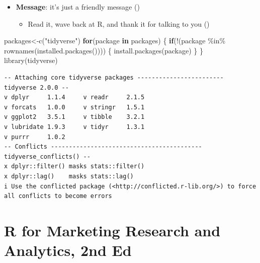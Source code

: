 \documentclass[
  ignorenonframetext,
]{beamer}
\newenvironment{Shaded}{\begin{snugshade}}{\end{snugshade}}
\newcommand{\ControlFlowTok}[1]{\textcolor[rgb]{0.00,0.23,0.31}{\textbf{#1}}}
\newcommand{\FunctionTok}[1]{\textcolor[rgb]{0.28,0.35,0.67}{#1}}
\newcommand{\NormalTok}[1]{\textcolor[rgb]{0.00,0.23,0.31}{#1}}
\newcommand{\OtherTok}[1]{\textcolor[rgb]{0.00,0.23,0.31}{#1}}
\newcommand{\SpecialCharTok}[1]{\textcolor[rgb]{0.37,0.37,0.37}{#1}}
\newcommand{\StringTok}[1]{\textcolor[rgb]{0.13,0.47,0.30}{#1}}
\providecommand{\tightlist}{%
  \setlength{\itemsep}{0pt}\setlength{\parskip}{0pt}}\usepackage{longtable,booktabs,array}
\begin{document}
\begin{frame}[fragile]{}
\label{section-12}
\normalsize

\begin{itemize}
\item
  \textbf{Message}: it's just a friendly message
  ()

  \begin{itemize}
  \tightlist
  \item
    Read it, wave back at R, and thank it for talking to you
    ()
  \end{itemize}
\end{itemize}

\tiny

\begin{Shaded}
\begin{Highlighting}[]
\NormalTok{packages}\OtherTok{\textless{}{-}}\FunctionTok{c}\NormalTok{(}\StringTok{"tidyverse"}\NormalTok{)}
\ControlFlowTok{for}\NormalTok{(package }\ControlFlowTok{in}\NormalTok{ packages) \{}
  \ControlFlowTok{if}\NormalTok{(}\SpecialCharTok{!}\NormalTok{(package }\SpecialCharTok{\%in\%} \FunctionTok{rownames}\NormalTok{(}\FunctionTok{installed.packages}\NormalTok{()))) \{}
    \FunctionTok{install.packages}\NormalTok{(package)}
\NormalTok{  \}}
\NormalTok{\}}
\FunctionTok{library}\NormalTok{(tidyverse)}
\end{Highlighting}
\end{Shaded}

\begin{verbatim}
-- Attaching core tidyverse packages ------------------------ tidyverse 2.0.0 --
v dplyr     1.1.4     v readr     2.1.5
v forcats   1.0.0     v stringr   1.5.1
v ggplot2   3.5.1     v tibble    3.2.1
v lubridate 1.9.3     v tidyr     1.3.1
v purrr     1.0.2     
-- Conflicts ------------------------------------------ tidyverse_conflicts() --
x dplyr::filter() masks stats::filter()
x dplyr::lag()    masks stats::lag()
i Use the conflicted package (<http://conflicted.r-lib.org/>) to force all conflicts to become errors
\end{verbatim}
\end{frame}

\section{R for Marketing Research and Analytics, 2nd
Ed}\label{r-for-marketing-research-and-analytics-2nd-ed}
\end{document}

